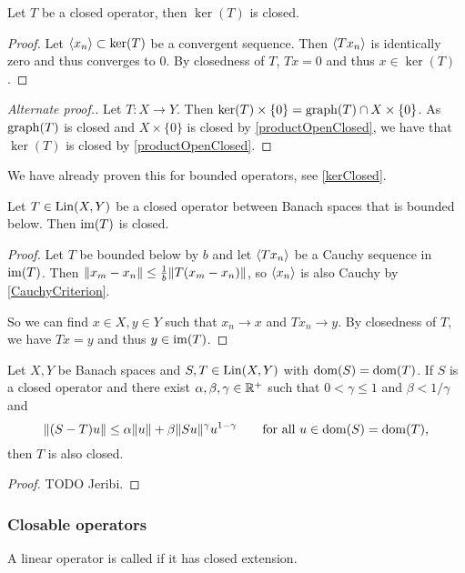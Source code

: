 \begin{lemma} \label{closedOperatorKernelClosed}
Let $T$ be a closed operator, then $\ker(T)$ is closed.
\end{lemma}
\begin{proof}
Let $\left\langle x_n \right\rangle\subset\ker(T)$ be a convergent sequence. Then $\left\langle Tx_n \right\rangle$ is identically zero and thus converges to $0$. By closedness of $T$, $Tx = 0$ and thus $x\in\ker(T)$. 
\end{proof}
\begin{proof}[Alternate proof.]
Let $T: X\to Y$. Then $\ker(T)\times\{0\} = \operatorname{graph}(T)\cap X\times\{0\}$. As $\operatorname{graph}(T)$ is closed and $X\times\{0\}$ is closed by \ref{productOpenClosed}, we have that $\ker(T)$ is closed by \ref{productOpenClosed}.
\end{proof}
We have already proven this for bounded operators, see \ref{kerClosed}.

\begin{proposition} \label{boundedBelowClosedRange}
Let $T\in \operatorname{Lin}(X, Y)$ be a closed operator between Banach spaces that is bounded below. Then $\operatorname{im}(T)$ is closed.
\end{proposition}
\begin{proof}
Let $T$ be bounded below by $b$ and let $\left\langle Tx_n \right\rangle$ be a Cauchy sequence in $\operatorname{im}(T)$. Then $\lVert x_m - x_n\rVert \leq \frac{1}{b}\lVert T(x_m - x_n)\rVert$, so $\left\langle x_n \right\rangle$ is also Cauchy by \ref{CauchyCriterion}.

So we can find $x\in X,y\in Y$ such that $x_n\to x$ and $Tx_n\to y$. By closedness of $T$, we have $Tx = y$ and thus $y\in\operatorname{im}(T)$.
\end{proof}

\begin{proposition}
Let $X,Y$ be Banach spaces and $S,T\in \operatorname{Lin}(X,Y)$ with $\operatorname{dom}(S) = \operatorname{dom}(T)$. If $S$ is a closed operator and there exist $\alpha,\beta,\gamma\in \mathbb{R}^+$ such that $0 < \gamma \leq 1$ and $\beta < 1/\gamma$ and
\[ \lVert(S-T)u\rVert \leq \alpha \lVert u\rVert + \beta\lVert Su\rVert^\gamma{u}^{1-\gamma} \qquad\text{for all $u\in \operatorname{dom}(S) = \operatorname{dom}(T)$,} \]
then $T$ is also closed.
\end{proposition}
\begin{proof}
TODO Jeribi.
\end{proof}

\subsubsection{Closable operators}
\begin{definition}
A linear operator is called  if it has closed extension.
\end{definition}

